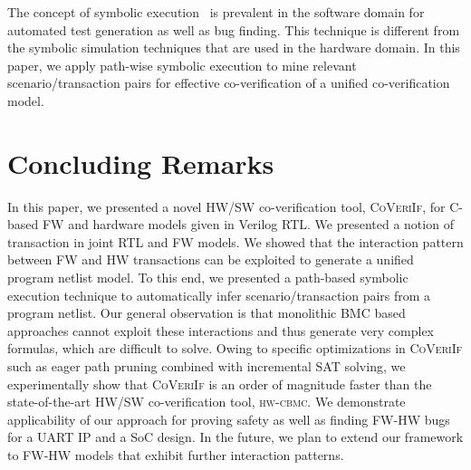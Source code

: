 \documentclass[sigconf]{acmart}
\newcommand{\tool}[1]{\textsc{#1}\xspace}
\newcommand{\hwcbmcv}{\tool{hw-cbmc}}
\newcommand{\verifox}{\tool{CoVeriIf}}
\begin{document}
The concept of symbolic execution~\cite{DBLP:journals/tse/Clarke76,
DBLP:conf/pldi/GodefroidKS05, DBLP:conf/osdi/CadarDE08} is prevalent in the
software domain for automated test generation as well as bug finding.  This
technique is different from the symbolic simulation techniques that are used
in the hardware domain.  In this paper, we apply path-wise symbolic execution
to mine relevant scenario/transaction pairs for effective co-verification of 
a unified co-verification model.  

\section{Concluding Remarks}

In this paper, we presented a novel HW/SW co-verification tool, \verifox,
for C-based FW and hardware models given in Verilog RTL.  We presented a
notion of transaction in joint RTL and FW models.  We showed that the
interaction pattern between FW and HW transactions can be exploited to
generate a unified program netlist model.  To this end, we presented a
path-based symbolic execution technique to automatically infer
scenario/transaction pairs from a program netlist.  Our general observation
is that monolithic BMC based approaches cannot exploit these interactions
and thus generate very complex formulas, which are difficult to solve. 
Owing to specific optimizations in \verifox such as eager path pruning
combined with incremental SAT solving, we experimentally show that \verifox
is an order of magnitude faster than the state-of-the-art HW/SW
co-verification tool, \hwcbmcv.  We demonstrate applicability of our
approach for proving safety as well as finding FW-HW bugs for a UART IP and
a SoC design.  In the future, we plan to extend our framework to FW-HW
models that exhibit further interaction patterns.

%

 
\end{document}

